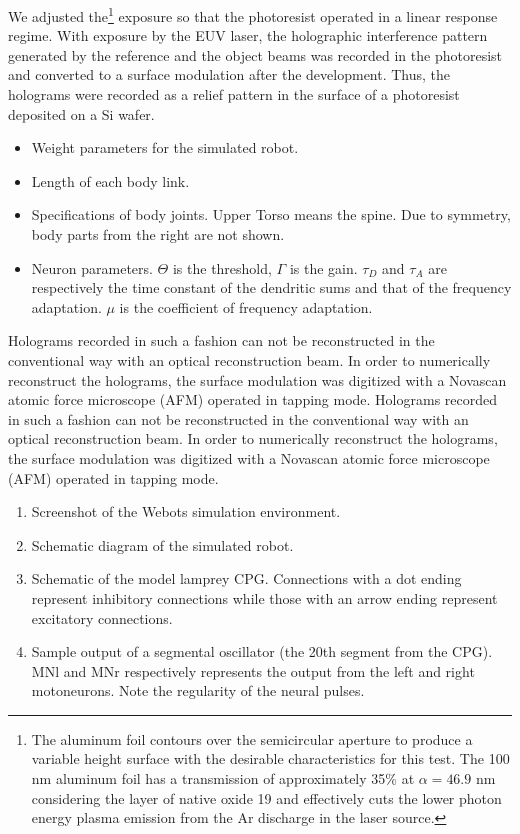 \documentclass[]{IEEEphot}
\begin{document}
We adjusted the\footnote{The aluminum foil contours over the semicircular aperture to produce a variable height surface with the desirable characteristics for this test. The 100 nm aluminum foil has a transmission of approximately 35\% at $\alpha=46.9$ nm considering the layer of native oxide 19 and effectively cuts the lower photon energy plasma emission from the Ar discharge in the laser source.} exposure so that the photoresist operated in a linear response regime. With exposure by the EUV laser, the holographic interference pattern generated by the reference and the object beams was recorded in the photoresist and converted to a surface modulation after the development.  Thus, the holograms were recorded as a relief pattern in the surface of a photoresist deposited on a Si wafer.
\begin{itemize}
\item Weight parameters for the simulated robot.
\item Length of each body link.
\item Specifications of body joints. Upper Torso means the spine. Due to symmetry, body parts from the right are not shown.
\item Neuron parameters. $\Theta$ is the threshold, $\Gamma$ is the gain. $\tau_{D}$ and $\tau_{A}$ are respectively the time constant of the dendritic sums and that of the frequency adaptation. $\mu$ is the coefficient of frequency adaptation.
\end{itemize}
Holograms recorded in such a fashion can not be reconstructed in the conventional way with an optical reconstruction beam. In order to numerically reconstruct the holograms, the surface modulation was digitized with a Novascan atomic force microscope (AFM) operated in tapping mode. Holograms recorded in such a fashion can not be reconstructed in the conventional way with an optical reconstruction beam. In order to numerically reconstruct the holograms, the surface modulation was digitized with a Novascan atomic force microscope (AFM) operated in tapping mode. 
\begin{enumerate}
\item Screenshot of the Webots simulation environment.
\item Schematic diagram of the simulated robot.
\item Schematic of the model lamprey CPG. Connections with a dot ending represent inhibitory connections while those with an arrow ending represent excitatory connections.
\item Sample output of a segmental oscillator (the 20th segment from the CPG). MNl and MNr respectively represents the output from the left and right motoneurons. Note the regularity of the neural pulses.
\end{enumerate}
\end{document}
